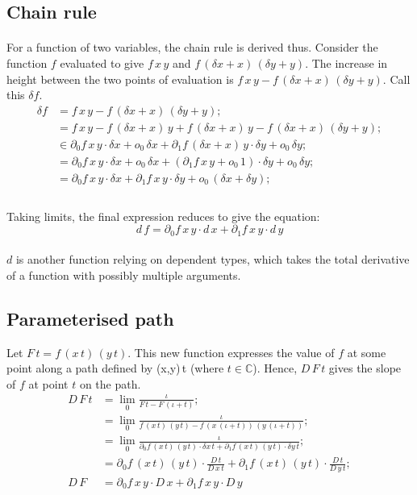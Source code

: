 \documentclass[11pt]{article}
\newcommand*\C{\ensuremath{\mathbb C}}
\newcommand*\id{\iota}
\newcommand*\cd{\cdot}
\newcommand*\prg{\paragraph}
\begin{document}
\subsection{Chain rule}
\prg{}For a function of two variables, the chain rule is derived thus. Consider the function $f$ evaluated to give $f\,x\,y$ and $f\,(\delta x+x)\,(\delta y+y)$. The increase in height between the two points of evaluation is $f\,x\,y-f\,(\delta x+x)\,(\delta y+y)$. Call this $\delta f$.
\[
\begin{aligned}
\delta f&=f\,x\,y-f\,(\delta x+x)\,(\delta y+y);\\
&=f\,x\,y-f\,(\delta x+x)\,y+f\,(\delta x+x)\,y-f\,(\delta x+x)\,(\delta y+y);\\
&\in\partial_0f\,x\,y\cd\delta x+o_0\,\delta x+\partial_1f\,(\delta x+x)\,y\cd\delta y+o_0\,\delta y;\\
&=\partial_0f\,x\,y\cd\delta x+o_0\,\delta x+(\partial_1f\,x\,y+o_0\,1)\cd\delta y+o_0\,\delta y;\\
&=\partial_0f\,x\,y\cd\delta x+\partial_1f\,x\,y\cd\delta y+o_0\,(\delta x+\delta y);\\
\end{aligned}
\]
\prg{}Taking limits, the final expression reduces to give the equation:
\[
d\,f=\partial_0f\,x\,y\cd d\,x+\partial_1f\,x\,y\cd d\,y
\]
\prg{}$d$ is another function relying on dependent types, which takes the total derivative of a function with possibly multiple arguments.

\subsection{Parameterised path}
Let $F\,t=f\,(x\,t)\,(y\,t)$. This new function expresses the value of $f$ at some point along a path defined by (x,y)\,t (where $t\in\C$). Hence, $D\,F\,t$ gives the slope of $f$ at point $t$ on the path.
\[
\begin{aligned}
D\,F\,t&=\lim_0\frac{\id}{F\,t-F\,(\id+t)};\\
&=\lim_0\frac{\id}{f\,(x\,t)\,(y\,t)-f\,(x\,(\id+t))\,(y\,(\id+t))};\\
&=\lim_0\frac{\id}{\partial_0f\,(x\,t)\,(y\,t)\cd\delta x\,t+\partial_1f\,(x\,t)\,(y\,t)\cd\delta y\,t};\\
&=\partial_0f\,(x\,t)\,(y\,t)\cd\frac{D\,t}{D\,x\,t}+\partial_1f\,(x\,t)\,(y\,t)\cd\frac{D\,t}{D\,y\,t};\\
D\,F&=\partial_0f\,x\,y\cd D\,x+\partial_1f\,x\,y\cd D\,y
\end{aligned}
\]
\end{document}
